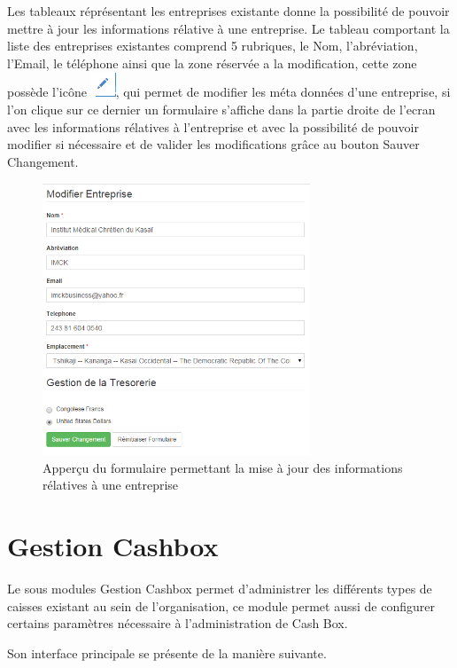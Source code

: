 \documentclass[12pt,a4paper]{report}
\begin{document}
Les tableaux réprésentant les entreprises existante donne la possibilité de pouvoir mettre à jour les informations rélative à une entreprise. Le tableau comportant la liste des entreprises existantes comprend 5 rubriques, le Nom, l'abréviation, l'Email, le téléphone ainsi que la zone réservée a la modification, cette zone possède l'icône \includegraphics[scale=0.7]{pic/EditUser.png}, qui permet de modifier les méta données d'une entreprise, si l'on clique sur ce dernier un formulaire s'affiche dans la partie droite de l'ecran avec les informations rélatives à l'entreprise et avec la possibilité de pouvoir modifier si nécessaire et de valider les modifications grâce au bouton Sauver Changement.
\begin{figure}[h]
\begin{center}
\includegraphics[width=8cm]{pic/ModEntreprise.png}
\end{center}
\caption{Apperçu du formulaire permettant la mise à jour des informations rélatives à une entreprise}
\label{Apperçu du formulaire permettant la mise à jour des informations rélatives à une entreprise}
\end{figure} 

\newpage
\section{Gestion Cashbox}
Le sous modules Gestion Cashbox permet d'administrer les différents types de caisses existant au sein de l'organisation, ce module permet aussi de configurer certains paramètres nécessaire à l'administration de Cash Box.

Son interface principale se présente de la manière suivante.
\end{document}
